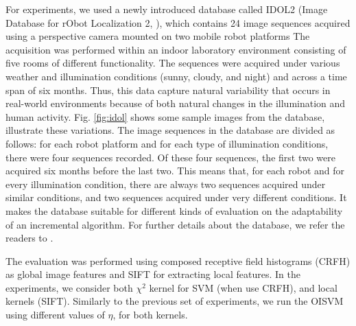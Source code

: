 For experiments, we used a newly introduced database called IDOL2 
(Image Database for rObot Localization 2, \cite{luo:idol2}), 
which contains 24 image sequences acquired using a perspective
camera mounted on two mobile robot platforms The acquisition was
performed within an indoor laboratory environment consisting of five 
rooms of different functionality. The sequences were acquired under
various weather and illumination conditions (sunny, cloudy, and night)
and across a time span of six months. Thus, this data capture natural
variability that occurs in real-world environments because of both 
natural changes in the illumination and human activity. Fig. \ref{fig:idol} 
shows some sample images from the database, illustrate these variations.
The image sequences in the database are divided as follows: for each robot
platform and for each type of illumination conditions, there were
four sequences recorded. Of these four sequences, the first two were 
acquired six months before the last two. This means that, for each robot
and for every illumination condition, there are always two sequences
acquired under similar conditions, and two sequences acquired under very
different conditions. It makes the database suitable for different kinds of
evaluation on the adaptability of an incremental algorithm. For further
details about the database, we refer the readers to \cite{luo:idol2}.

The evaluation was performed using composed receptive field histograms (CRFH)
\cite{linde:icpr04} as global image features and SIFT \cite{lowe99object} for
extracting local features. In the experiments, we consider both $\chi^2$ kernel
for SVM (when use CRFH), and local kernels \cite{wallraven:iccv03} (SIFT).
Similarly to the previous set of experiments, we run the OISVM using different
values of $\eta$, for both kernels.

